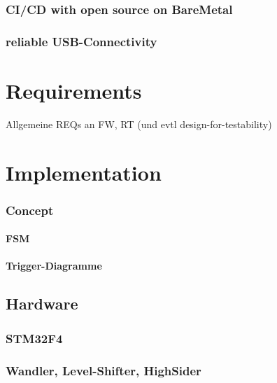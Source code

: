 \documentclass[master,english,smartquotes,apa]{hgbthesis}
\begin{document}
	\subsection{CI/CD with open source on BareMetal}
	\subsection{reliable USB-Connectivity}
	
	\chapter{Requirements}
	\label{cha:Requirements}
		Allgemeine REQs an FW, RT (und evtl design-for-testability)

	\chapter{Implementation}
	\label{cha:Implementation}
		\subsection{Concept}
		\subsubsection{FSM}
		\subsubsection{Trigger-Diagramme}

		\section{Hardware}
			\subsection{STM32F4}
			\subsection{Wandler, Level-Shifter, HighSider}
\end{document}
